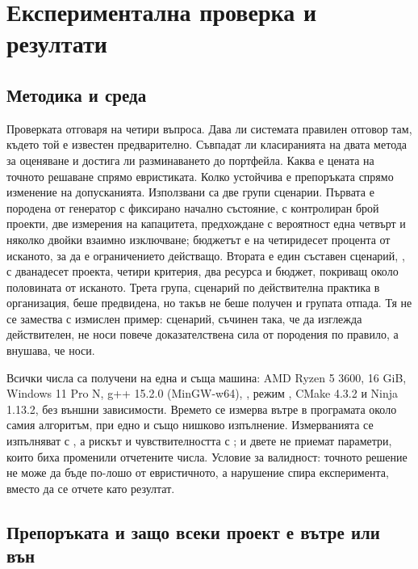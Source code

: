 \section{Експериментална проверка и резултати}
\label{sec:results}

\subsection{Методика и среда}

Проверката отговаря на четири въпроса. Дава ли системата правилен отговор там,
където той е известен предварително. Съвпадат ли класиранията на двата метода за
оценяване и достига ли разминаването до портфейла. Каква е цената на точното
решаване спрямо евристиката. Колко устойчива е препоръката спрямо изменение на
допусканията. Използвани са две групи сценарии. Първата е породена от генератор с фиксирано
начално състояние, с контролиран брой проекти, две измерения на капацитета,
предхождане с вероятност една четвърт и няколко двойки взаимно изключване;
бюджетът е на четиридесет процента от исканото, за да е ограничението действащо.
Втората е един съставен сценарий, , с дванадесет
проекта, четири критерия, два ресурса и бюджет, покриващ около половината от
исканото. Трета група, сценарий по действителна практика в организация, беше
предвидена, но такъв не беше получен и групата отпада. Тя не се замества с
измислен пример: сценарий, съчинен така, че да изглежда действителен, не носи
повече доказателствена сила от породения по правило, а внушава, че носи.

Всички числа са получени на една и съща машина: AMD Ryzen 5 3600, 16 GiB,
Windows 11 Pro N, g++ 15.2.0 (MinGW-w64), , режим ,
CMake 4.3.2 и Ninja 1.13.2, без външни зависимости. Времето се измерва вътре в
програмата около самия алгоритъм, при едно и също нишково изпълнение.
Измерванията се изпълняват с , а рискът и чувствителността с
; и двете не приемат параметри, които биха променили отчетените
числа. Условие за валидност: точното решение не може да бъде по-лошо от
евристичното, а нарушение спира експеримента, вместо да се отчете като резултат.

\subsection{Препоръката и защо всеки проект е вътре или вън}

